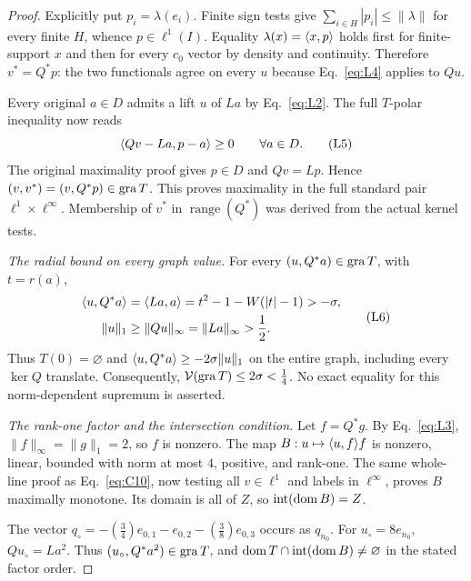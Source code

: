 \begin{proof}
Explicitly put $p_i=\lambda(e_i)$. Finite sign tests give
$\sum_{i\in H}|p_i|\le\|\lambda\|$ for every finite $H$, whence
$p\in\ell^1(I)$. Equality $\lambda(x)=\langle x,p\rangle$ holds first for
finite-support $x$ and then for every $c_0$ vector by density and continuity.
Therefore $v^*=Q^*p$: the two functionals agree on every $u$ because
Eq.~\eqref{eq:L4} applies to $Qu$.

Every original $a\in D$ admits a lift $u$ of $La$ by Eq.~\eqref{eq:L2}.
The full $T$-polar inequality now reads
\begin{equation}
\langle Qv-La,p-a\rangle\ge0\qquad\forall a\in D.
\tag{L5}\label{eq:L5}
\end{equation}
The original maximality proof gives $p\in D$ and $Qv=Lp$. Hence
$(v,v^*)=(v,Q^*p)\in\operatorname{gra} T$. This proves maximality in the
full standard pair $\ell^1\times\ell^\infty$. Membership of $v^*$ in
$\operatorname{range}(Q^*)$ was derived from the actual kernel tests.

\noindent\textit{The radial bound on every graph value.}
\label{sec:L3}
For every $(u,Q^*a)\in\operatorname{gra} T$, with $t=r(a)$,
\begin{equation}
\begin{aligned}
\langle u,Q^*a\rangle&=\langle La,a\rangle
 =t^2-1-W(|t|-1)>-\sigma,\\
\|u\|_1&\ge\|Qu\|_\infty=\|La\|_\infty>\frac{1}{2}.
\end{aligned}
\tag{L6}\label{eq:L6}
\end{equation}
Thus $T(0)=\varnothing$ and $\langle u,Q^*a\rangle\ge-2\sigma\|u\|_1$ on
the entire graph, including every $\ker Q$ translate. Consequently,
$\mathcal V(\operatorname{gra} T)\le2\sigma<\frac{1}{4}$. No exact equality for this
norm-dependent supremum is asserted.

\noindent\textit{The rank-one factor and the intersection condition.}
\label{sec:L4}
Let $f=Q^*g$. By Eq.~\eqref{eq:L3}, $\|f\|_\infty=\|g\|_1=2$, so $f$
is nonzero. The map $B:u\mapsto\langle u,f\rangle f$ is nonzero, linear, bounded
with norm at most $4$, positive, and rank-one. The same whole-line proof
as Eq.~\eqref{eq:C10}, now testing all $v\in\ell^1$ and labels in
$\ell^\infty$, proves $B$ maximally monotone.
Its domain is all of $Z$, so $\operatorname{int}(\operatorname{dom} B)=Z$.

The vector $q_\circ=-(\frac{3}{4})e_{0,1}-e_{0,2}-(\frac{3}{8})e_{0,3}$ occurs as
$q_{n_0}$. For $u_\circ=8e_{n_0}$, $Qu_\circ=La^2$.
Thus $(u_\circ,Q^*a^2)\in\operatorname{gra} T$, and
$\operatorname{dom} T\cap\operatorname{int}(\operatorname{dom} B)\ne\varnothing$ in the stated
factor order.


\end{proof}

